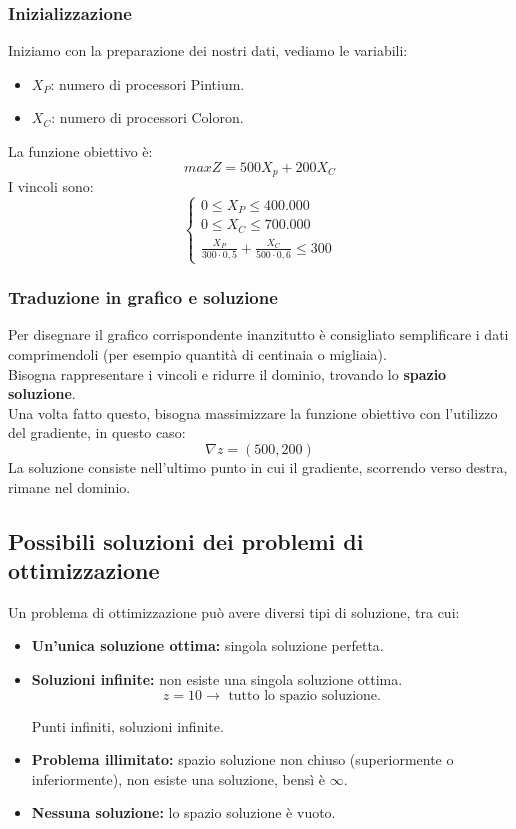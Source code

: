 \documentclass[12pt,a4paper]{article}
\begin{document}
\subsubsection{Inizializzazione}
Iniziamo con la preparazione dei nostri dati, vediamo le variabili:
\begin{itemize}
    \item $X_P$: numero di processori Pintium.
    \item $X_C$: numero di processori Coloron.
\end{itemize}
La funzione obiettivo è:
\[
maxZ = 500X_p + 200X_C
\]
I vincoli sono:
\[
\begin{cases}
    0 \leq X_P \leq 400.000\\
    0 \leq X_C \leq 700.000\\
    \frac{X_P}{300 \cdot 0,5} + \frac{X_C}{500 \cdot 0,6} \leq 300
\end{cases}
\]

\subsubsection{Traduzione in grafico e soluzione}
Per disegnare il grafico corrispondente inanzitutto è consigliato semplificare i dati comprimendoli (per esempio quantità di centinaia o migliaia).\\
Bisogna rappresentare i vincoli e ridurre il dominio, trovando lo \textbf{spazio soluzione}.\\
Una volta fatto questo, bisogna massimizzare la funzione obiettivo con l'utilizzo del gradiente, in questo caso:
\[
\nabla z = (500,200)
\]
La soluzione consiste nell'ultimo punto in cui il gradiente, scorrendo verso destra, rimane nel dominio.
\subsection{Possibili soluzioni dei problemi di ottimizzazione}
Un problema di ottimizzazione può avere diversi tipi di soluzione, tra cui:
\begin{itemize}
    \item \textbf{Un'unica soluzione ottima:} singola soluzione perfetta.
    \item \textbf{Soluzioni infinite:} non esiste una singola soluzione ottima.
    \[
    z = 10 \rightarrow \text{ tutto lo spazio soluzione.}
    \]
    \begin{center}
        Punti infiniti, soluzioni infinite.
    \end{center}
    \item \textbf{Problema illimitato:} spazio soluzione non chiuso (superiormente o inferiormente), non esiste una soluzione, bensì è $\infty$.
    \item \textbf{Nessuna soluzione:} lo spazio soluzione è vuoto.
\end{itemize}
\end{document}
